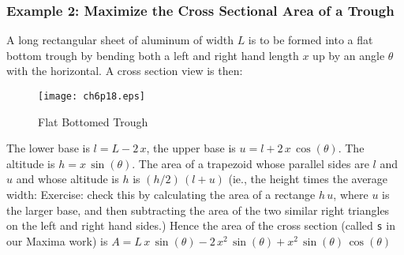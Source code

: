 \documentclass[12pt]{article}
\begin{document}
\subsubsection{Example 2: Maximize the Cross Sectional Area of a Trough}
A long rectangular sheet of aluminum of width $L$ is to be formed into a flat bottom
  trough by bending both a left and right hand length $x$ up by an angle $\theta$
  with the horizontal.
A cross section view is then:
\begin{figure} [h]
   \centerline{\texttt{[image: ch6p18.eps]} }
	\caption{ Flat Bottomed Trough }
\end{figure}        
%

\smallskip
The lower base is $l= L - 2\,x$, the upper base is $u =l + 2\,x\,\cos(\theta)$.
The altitude is $h= x\,\sin(\theta)$.
The area of a trapezoid whose parallel sides are $l$ and $u$ and whose altitude is $h$
  is $(h/2)\,(l + u)$ (ie., the height times the average width: Exercise: check this
  by calculating the area of a rectange $h\,u$, where $u$ is the larger base, and
  then subtracting the area of the two similar right triangles on the left
  and right hand sides.)
Hence the area of the cross section (called \verb|s| in our Maxima work)
 is $A = L\,x\,\sin(\theta) - 2\,x^2\,\sin(\theta) + x^2\,\sin(\theta)\,\cos(\theta)$
 
\end{document}
